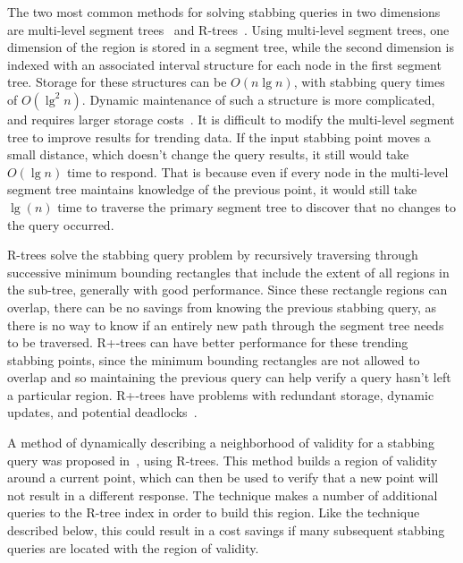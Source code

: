 \documentclass{stdbm}
\begin{document}
The two most common methods for solving stabbing queries in two
dimensions are multi-level segment trees~\cite{berg00comput-geomet}
and R-trees~\cite{guttm84r-tree}.  Using multi-level segment trees,
one dimension of the region is stored in a segment tree, while the
second dimension is indexed with an associated interval structure for
each node in the first segment tree.  Storage for these structures can
be $O(n\lg{n})$, with stabbing query times of $O(\lg^2{n})$.  Dynamic
maintenance of such a structure is more complicated, and requires
larger storage costs~\cite{krevel88concat-segmen}.  It is difficult to
modify the multi-level segment tree to improve results for trending
data.  If the input stabbing point moves a small distance, which
doesn't change the query results, it still would take $O(\lg{n})$ time
to respond.  That is because even if every node in the multi-level
segment tree maintains knowledge of the previous point, it would still
take $\lg({n})$ time to traverse the primary segment tree to discover
that no changes to the query occurred.

R-trees solve the stabbing query problem by recursively traversing
through successive minimum bounding rectangles that include the extent
of all regions in the sub-tree, generally with good performance.
Since these rectangle regions can overlap, there can be no savings
from knowing the previous stabbing query, as there is no way to know
if an entirely new path through the segment tree needs to be
traversed.  R+-trees\cite{sellis87r-tree} can have better performance
for these trending stabbing points, since the minimum bounding
rectangles are not allowed to overlap and so maintaining the previous
query can help verify a query hasn't left a particular region.
R+-trees have problems with redundant storage, dynamic updates, and
potential deadlocks~\cite{manol03r-have}.

A method of dynamically describing a neighborhood of validity for a
stabbing query was proposed in~\cite{zhang03locat}, using R-trees.
This method builds a region of validity around a current point, which
can then be used to verify that a new point will not result in a
different response.  The technique makes a number of additional
queries to the R-tree index in order to build this region.  Like the
technique described below, this could result in a cost savings if many
subsequent stabbing queries are located with the region of validity.
\end{document}
